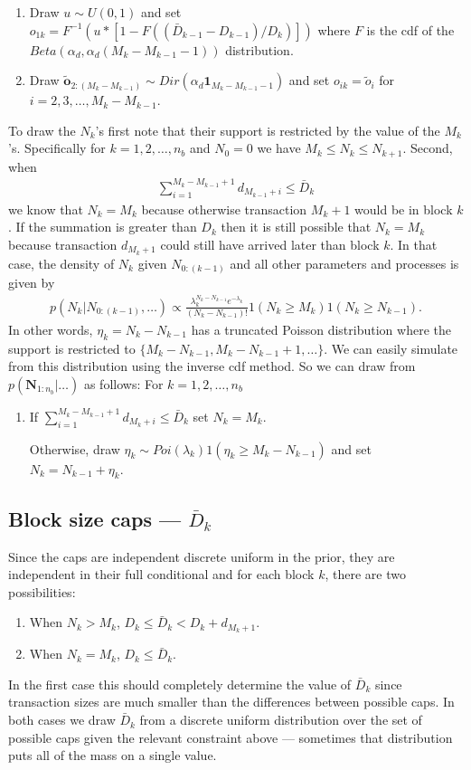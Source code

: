 \documentclass{article}
\begin{document}
\begin{enumerate}
\item Draw $u \sim U(0,1)$ and set $o_{1k} = F^{-1}(u*[1 - F((\bar{D}_{k-1} - D_{k-1})/D_k)])$ where $F$ is the cdf of the $Beta(\alpha_d, \alpha_d(M_k - M_{k-1} - 1))$ distribution.
\item Draw $\tilde{\bm{o}}_{2:(M_k - M_{k-1})}\sim Dir(\alpha_d\bm{1}_{M_k - M_{k-1} - 1})$ and set $o_{ik} = \tilde{o}_i$ for $i = 2,3,\dots,M_k - M_{k-1}$.
\end{enumerate}

To draw the $N_k$'s first note that their support is restricted by the value of the $M_k$'s. Specifically for $k=1,2,\dots,n_b$ and $N_0 = 0$ we have $M_k \le N_k \le N_{k+1}$. Second, when 
\begin{align*}
\sum_{i=1}^{M_k - M_{k-1} + 1}d_{M_{k-1} + i} \le \bar{D}_k
\end{align*}
we know that $N_k = M_k$ because otherwise transaction $M_k + 1$ would be in block $k$. If the summation is greater than $D_k$ then it is still possible that $N_k = M_k$ because transaction $d_{M_k + 1}$ could still have arrived later than block $k$. In that case, the density of $N_k$ given $N_{0:(k-1)}$ and all other parameters and processes is given by
\begin{align*}
p(N_k|N_{0:(k-1)}, \dots) \propto \frac{\lambda_k^{N_k - N_{k-1}}e^{-\lambda_k}}{(N_k - N_{k-1})!}1(N_k \ge M_k)1(N_k \ge N_{k-1}).
\end{align*}
In other words, $\eta_k = N_k - N_{k-1}$ has a truncated Poisson distribution where the support is restricted to $\{M_k - N_{k-1}, M_k - N_{k-1} + 1, \dots \}$. We can easily simulate from this distribution using the inverse cdf method. So we can draw from $p(\bm{N}_{1:n_b}|\dots)$ as follows: For $k=1,2,\dots,n_b$
\begin{enumerate}
\item If $\sum_{i=1}^{M_k - M_{k-1} + 1} d_{M_k + i} \le \bar{D}_k$ set $N_k = M_k$.

Otherwise, draw $\eta_k \sim Poi(\lambda_k)1(\eta_k \ge M_k - N_{k-1})$ and set $N_k = N_{k-1} + \eta_k$.
\end{enumerate}
\subsection{Block size caps --- $\bar{D}_k$}
Since the caps are independent discrete uniform in the prior, they are independent in their full conditional and for each block $k$, there are two possibilities:
\begin{enumerate}
\item When $N_k > M_k$, $D_k \le \bar{D}_k < D_k + d_{M_k+1}$.
\item When $N_k = M_k$, $D_k \le \bar{D}_k$.
\end{enumerate}
In the first case this should completely determine the value of $\bar{D}_k$ since transaction sizes are much smaller than the differences between possible caps. In both cases we draw $\bar{D}_k$ from a discrete uniform distribution over the set of possible caps given the relevant constraint above --- sometimes that distribution puts all of the mass on a single value.
\end{document}
